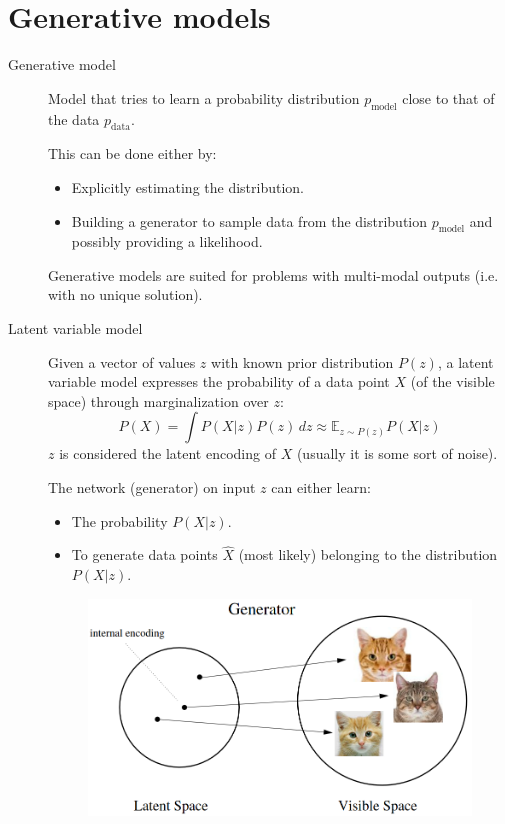 \chapter{Generative models}

\begin{description}
    \item[Generative model] 
        Model that tries to learn a probability distribution $p_\text{model}$ close to that of the data $p_\text{data}$.

        This can be done either by:
        \begin{itemize}
            \item Explicitly estimating the distribution.
            \item Building a generator to sample data from the distribution $p_\text{model}$ and possibly providing a likelihood.
        \end{itemize}

        \begin{remark}
            Generative models are suited for problems with multi-modal outputs (i.e. with no unique solution).
        \end{remark}

    \item[Latent variable model] 
        Given a vector of values $z$ with known prior distribution $P(z)$,
        a latent variable model expresses the probability of a data point $X$ (of the visible space) through marginalization over $z$:
        \[ P(X) = \int P(X|z) P(z) \,dz \approx \mathbb{E}_{z \sim P(z)} P(X|z) \]
        $z$ is considered the latent encoding of $X$ (usually it is some sort of noise).

        The network (generator) on input $z$ can either learn:
        \begin{itemize}
            \item The probability $P(X|z)$.
            \item To generate data points $\hat{X}$ (most likely) belonging to the distribution $P(X|z)$.
        \end{itemize} 

        \begin{figure}[H]
            \centering
            \includegraphics[width=0.45\linewidth]{./img/latent_space.png}
        \end{figure}
\end{description}

